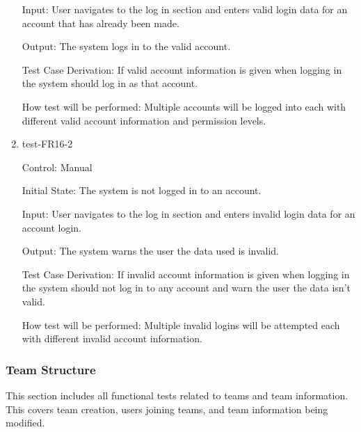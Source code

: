 \documentclass[12pt, titlepage]{article}
\begin{document}
\begin{enumerate}
  Input: User navigates to the log in section and enters valid login data for
  an account that has already been made.
            
  Output: The system logs in to the valid account.
  
  Test Case Derivation: If valid account information is given when logging in
  the system should log in as that account.
  
  How test will be performed: Multiple accounts will be logged into each with
  different valid account information and permission levels.

  \item{test-FR16-2\\}

  Control: Manual
            
  Initial State: The system is not logged in to an account.
            
  Input: User navigates to the log in section and enters invalid login data
  for an account login.
            
  Output: The system warns the user the data used is invalid.
  
  Test Case Derivation: If invalid account information is given when logging
  in the system should not log in to any account and warn the user the data
  isn't valid.
  
  How test will be performed: Multiple invalid logins will be attempted each
  with different invalid account information.

\end{enumerate}

\subsubsection{Team Structure}

This section includes all functional tests related to teams and team
information. This covers team creation, users joining teams, and team
information being modified.
\end{document}
